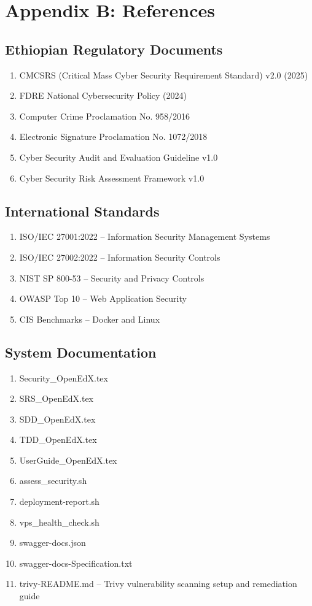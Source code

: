 \section{Appendix B: References}

\subsection{Ethiopian Regulatory Documents}
\begin{enumerate}
    \item CMCSRS (Critical Mass Cyber Security Requirement Standard) v2.0 (2025)
    \item FDRE National Cybersecurity Policy (2024)
    \item Computer Crime Proclamation No. 958/2016
    \item Electronic Signature Proclamation No. 1072/2018
    \item Cyber Security Audit and Evaluation Guideline v1.0
    \item Cyber Security Risk Assessment Framework v1.0
\end{enumerate}

\subsection{International Standards}
\begin{enumerate}
    \item ISO/IEC 27001:2022 – Information Security Management Systems
    \item ISO/IEC 27002:2022 – Information Security Controls
    \item NIST SP 800-53 – Security and Privacy Controls
    \item OWASP Top 10 – Web Application Security
    \item CIS Benchmarks – Docker and Linux
\end{enumerate}

\subsection{System Documentation}
\begin{enumerate}
    \item Security\_OpenEdX.tex
    \item SRS\_OpenEdX.tex
    \item SDD\_OpenEdX.tex
    \item TDD\_OpenEdX.tex
    \item UserGuide\_OpenEdX.tex
    \item assess\_security.sh
    \item deployment-report.sh
    \item vps\_health\_check.sh
    \item swagger-docs.json
    \item swagger-docs-Specification.txt
    \item trivy-README.md – Trivy vulnerability scanning setup and remediation guide
\end{enumerate}

